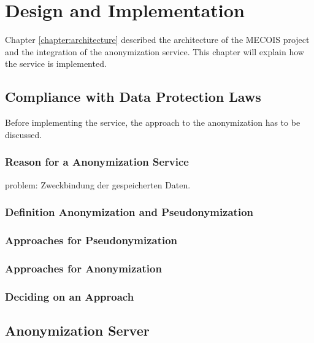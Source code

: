 \chapter{Design and Implementation}
\label{chapter:design_and_implementation}

Chapter \ref{chapter:architecture} described the architecture of the MECOIS project and the integration of the anonymization service. This chapter will explain how the service is implemented.

\section{Compliance with Data Protection Laws}
\label{sec:compliance_with_data_protection_laws}

Before implementing the service, the approach to the anonymization has to be discussed.

\subsection{Reason for a Anonymization Service}
\label{subsec:reason_for_a_anonymization_service}

problem: Zweckbindung der gespeicherten Daten.

\subsection{Definition Anonymization and Pseudonymization}
\label{subsec:definition_anonymization_and_pseudonymization}

\subsection{Approaches for Pseudonymization}
\label{subsec:approaches_for_pseudonymization}

\subsection{Approaches for Anonymization}
\label{subsec:approaches_for_anonymization}

\subsection{Deciding on an Approach}
\label{subsec:deciding_on_an_approach}

\section{Anonymization Server}
\label{sec:anonymization_server}

